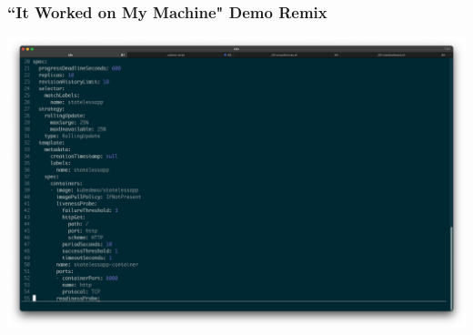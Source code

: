     \begin{frame}
        \frametitle{``It Worked on My Machine" Demo Remix}
        \includegraphics[width=\textwidth,height=0.85\textheight,keepaspectratio]{graphics/screenshots/04-deploymentManifest}
    \end{frame}


